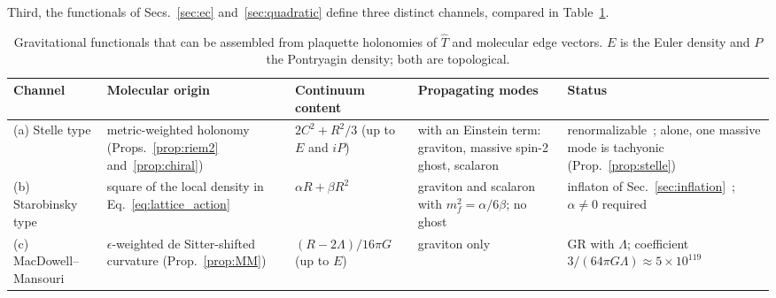 \documentclass[reprint,aps,prd,amsmath,amssymb,superscriptaddress,nofootinbib,floatfix]{revtex4-2}
\theoremstyle{plain}
\theoremstyle{definition}
\theoremstyle{remark}
\newcommand{\Tc}{\hat{T}}
\begin{document}
Third, the functionals of Secs.~\ref{sec:ec} and~\ref{sec:quadratic} define three distinct channels, compared in
Table~\ref{tab:channels}.

\begin{table}[t]
\caption{\label{tab:channels}Gravitational functionals that can be assembled from plaquette holonomies of
$\Tc$ and molecular edge vectors. $E$ is the Euler density and $P$ the Pontryagin density; both are topological.}
\begin{ruledtabular}
\begin{tabular}{lllll}
\parbox[t]{0.12\textwidth}{\raggedright Channel\strut} & \parbox[t]{0.22\textwidth}{\raggedright Molecular origin\strut} & \parbox[t]{0.15\textwidth}{\raggedright Continuum content\strut} & \parbox[t]{0.25\textwidth}{\raggedright Propagating modes\strut} & \parbox[t]{0.18\textwidth}{\raggedright Status\strut} \\
\hline
\parbox[t]{0.12\textwidth}{\raggedright (a) Stelle type\strut} & \parbox[t]{0.22\textwidth}{\raggedright metric-weighted holonomy (Props.~\ref{prop:riem2} and~\ref{prop:chiral})\strut} & \parbox[t]{0.15\textwidth}{\raggedright $2C^2+R^2/3$ (up to $E$ and $iP$)\strut} & \parbox[t]{0.25\textwidth}{\raggedright with an Einstein term: graviton, massive spin-2 ghost,
scalaron~\cite{Stelle1978}\strut} & \parbox[t]{0.18\textwidth}{\raggedright renormalizable~\cite{Stelle1977}; alone, one massive mode is tachyonic (Prop.~\ref{prop:stelle})\strut} \\
\parbox[t]{0.12\textwidth}{\raggedright (b) Starobinsky type\strut} & \parbox[t]{0.22\textwidth}{\raggedright square of the local density in Eq.~\eqref{eq:lattice_action}\strut} & \parbox[t]{0.15\textwidth}{\raggedright $\alpha R+\beta R^2$\strut} & \parbox[t]{0.25\textwidth}{\raggedright graviton and scalaron with $m_f^2=\alpha/6\beta$; no ghost~\cite{AlvarezGaume2016}\strut} & \parbox[t]{0.18\textwidth}{\raggedright inflaton of Sec.~\ref{sec:inflation}~\cite{Starobinsky1980,Planck2018}; $\alpha\neq0$ required\strut} \\
\parbox[t]{0.12\textwidth}{\raggedright (c) MacDowell--Mansouri\strut} & \parbox[t]{0.22\textwidth}{\raggedright $\epsilon$-weighted de Sitter-shifted curvature (Prop.~\ref{prop:MM})\strut} & \parbox[t]{0.15\textwidth}{\raggedright $(R-2\Lambda)/16\pi G$ (up to $E$)\strut} & \parbox[t]{0.25\textwidth}{\raggedright graviton only\strut} & \parbox[t]{0.18\textwidth}{\raggedright GR with $\Lambda$; coefficient
$3/(64\pi G\Lambda)\approx5\times10^{119}$\strut}
\end{tabular}
\end{ruledtabular}
\end{table}
\end{document}

